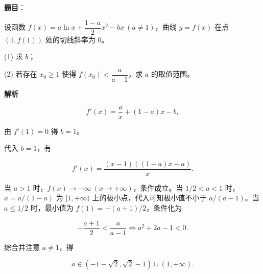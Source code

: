 \begin{answer}

\textbf{题目}：

设函数 $f(x)=a\ln x+\dfrac{1-a}{2}x^2-bx\ (a\ne1)$，曲线 $y=f(x)$ 在点 $(1,f(1))$ 处的切线斜率为 $0$。

(1) 求 $b$；

(2) 若存在 $x_0\geqslant1$ 使得 $f(x_0)<\dfrac{a}{a-1}$，求 $a$ 的取值范围。

\textbf{解析}


\nopagebreak[4]
\[
f'(x)=\frac ax+(1-a)x-b,
\]

由 $f'(1)=0$ 得 $b=1$。


代入 $b=1$，有

\nopagebreak[4]
\[
f'(x)=\frac{(x-1)((1-a)x-a)}{x}.
\]

当 $a>1$ 时，$f(x)\to-\infty\ (x\to+\infty)$，条件成立。当 $1/2<a<1$ 时，$x=a/(1-a)$ 为 $[1,+\infty)$ 上的极小点，代入可知极小值不小于 $a/(a-1)$。当 $a\leqslant1/2$ 时，最小值为 $f(1)=-(a+1)/2$，条件化为

\nopagebreak[4]
\[
-\frac{a+1}{2}<\frac a{a-1}
\iff a^2+2a-1<0.
\]

综合并注意 $a\ne1$，得

\nopagebreak[4]
\[
a\in(-1-\sqrt2,\sqrt2-1)\cup(1,+\infty).
\]



\end{answer}
